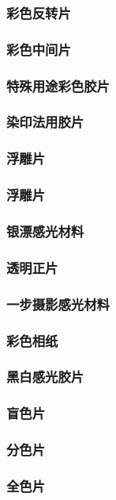 \documentclass[UTF8]{../../ApplicationUniverse}
\begin{document}
            \subsubsection{彩色反转片}
            \subsubsection{彩色中间片}
            \subsubsection{特殊用途彩色胶片}
        \subsubsection{染印法用胶片}
            \subsubsection{浮雕片}
            \subsubsection{浮雕片}
        \subsubsection{银漂感光材料}
            \subsubsection{透明正片}
        \subsubsection{一步摄影感光材料}
        \subsubsection{彩色相纸}
    \subsubsection{黑白感光胶片}
        \subsubsection{盲色片}
        \subsubsection{分色片}
        \subsubsection{全色片}
\end{document}
